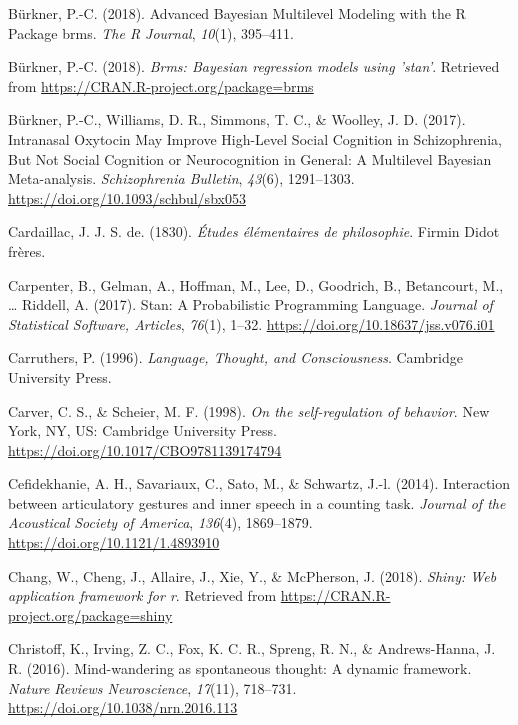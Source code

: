\documentclass[a4paper,12pt,twoside,openright,oldfontcommands]{memoir}
\begin{document}
\leavevmode\hypertarget{ref-burkner_advanced_2018}{}%
Bürkner, P.-C. (2018). Advanced Bayesian Multilevel Modeling with the R Package brms. \emph{The R Journal}, \emph{10}(1), 395--411.

\leavevmode\hypertarget{ref-R-brms}{}%
Bürkner, P.-C. (2018). \emph{Brms: Bayesian regression models using 'stan'}. Retrieved from \url{https://CRAN.R-project.org/package=brms}

\leavevmode\hypertarget{ref-burkner_intranasal_2017}{}%
Bürkner, P.-C., Williams, D. R., Simmons, T. C., \& Woolley, J. D. (2017). Intranasal Oxytocin May Improve High-Level Social Cognition in Schizophrenia, But Not Social Cognition or Neurocognition in General: A Multilevel Bayesian Meta-analysis. \emph{Schizophrenia Bulletin}, \emph{43}(6), 1291--1303. \url{https://doi.org/10.1093/schbul/sbx053}

\leavevmode\hypertarget{ref-cardaillac_etudes_1830}{}%
Cardaillac, J. J. S. de. (1830). \emph{Études élémentaires de philosophie}. Firmin Didot frères.

\leavevmode\hypertarget{ref-carpenter_stan_2017}{}%
Carpenter, B., Gelman, A., Hoffman, M., Lee, D., Goodrich, B., Betancourt, M., \ldots{} Riddell, A. (2017). Stan: A Probabilistic Programming Language. \emph{Journal of Statistical Software, Articles}, \emph{76}(1), 1--32. \url{https://doi.org/10.18637/jss.v076.i01}

\leavevmode\hypertarget{ref-carruthers_language_1996}{}%
Carruthers, P. (1996). \emph{Language, Thought, and Consciousness}. Cambridge University Press.

\leavevmode\hypertarget{ref-carver_self-regulation_1998}{}%
Carver, C. S., \& Scheier, M. F. (1998). \emph{On the self-regulation of behavior}. New York, NY, US: Cambridge University Press. \url{https://doi.org/10.1017/CBO9781139174794}

\leavevmode\hypertarget{ref-cefidekhanie_interaction_2014}{}%
Cefidekhanie, A. H., Savariaux, C., Sato, M., \& Schwartz, J.-l. (2014). Interaction between articulatory gestures and inner speech in a counting task. \emph{Journal of the Acoustical Society of America}, \emph{136}(4), 1869--1879. \url{https://doi.org/10.1121/1.4893910}

\leavevmode\hypertarget{ref-R-shiny}{}%
Chang, W., Cheng, J., Allaire, J., Xie, Y., \& McPherson, J. (2018). \emph{Shiny: Web application framework for r}. Retrieved from \url{https://CRAN.R-project.org/package=shiny}

\leavevmode\hypertarget{ref-christoff_mind-wandering_2016}{}%
Christoff, K., Irving, Z. C., Fox, K. C. R., Spreng, R. N., \& Andrews-Hanna, J. R. (2016). Mind-wandering as spontaneous thought: A dynamic framework. \emph{Nature Reviews Neuroscience}, \emph{17}(11), 718--731. \url{https://doi.org/10.1038/nrn.2016.113}
\end{document}
